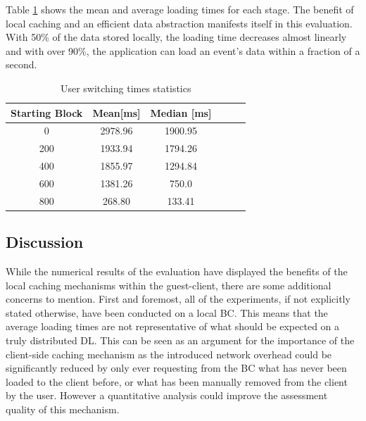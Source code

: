 Table \ref{tab:caching} shows the mean and average loading times for each stage. The benefit of local caching and an efficient data abstraction manifests itself in this evaluation. With 50\% of the data stored locally, the loading time decreases almost linearly and with over 90\%, the application can load an event's data within a fraction of a second.
 
\begin{table}[ht]
\centering
\begin{tabular}{|c|c|c|c|c|c|}
\hline
\textbf{Starting Block} & \textbf{Mean[ms]} & \textbf{Median [ms]} \\ \hline
0   & 2978.96         & 1900.95    \\ \hline
200 & 1933.94         &  1794.26   \\ \hline
400 & 1855.97         &  1294.84    \\ \hline
600 & 1381.26         &  750.0    \\ \hline
800 & 268.80          &  133.41     \\ \hline
\end{tabular}
\caption{User switching times statistics}
\label{tab:caching}
\end{table}

\subsection{Discussion}\label{section:eval-discussion}

While the numerical results of the evaluation have displayed the benefits of the local caching mechanisms within the guest-client, there are some additional concerns to mention. First and foremost, all of the experiments, if not explicitly stated otherwise, have been conducted on a local BC. This means that the average loading times are not representative of what should be expected on a truly distributed DL. This can be seen as an argument for the importance of the client-side caching mechanism as the introduced network overhead could be significantly reduced by only ever requesting from the BC what has never been loaded to the client before, or what has been manually removed from the client by the user. However a quantitative analysis could improve the assessment quality of this mechanism.
